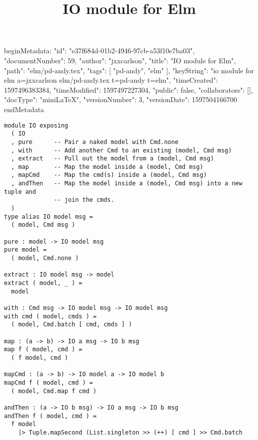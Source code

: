 beginMetadata:
{
    "id": "e37f684d-01b2-4946-97cb-a53f10e7ba03",
    "documentNumber": 59,
    "author": "jxxcarlson",
    "title": "IO module for Elm",
    "path": "elm/pd-andy.tex",
    "tags": [
        "pd-andy",
        "elm"
    ],
    "keyString": "io module for elm a=jxxcarlson elm/pd-andy.tex t=pd-andy t=elm",
    "timeCreated": 1597496383384,
    "timeModified": 1597497227304,
    "public": false,
    "collaborators": [],
    "docType": "miniLaTeX",
    "versionNumber": 3,
    "versionDate": 1597504166700
}
endMetadata\title{IO module for Elm}

\maketitle 


\begin{verbatim}
module IO exposing
  ( IO
  , pure      -- Pair a naked model with Cmd.none
  , with      -- Add another Cmd to an existing (model, Cmd msg)
  , extract   -- Pull out the model from a (model, Cmd msg)
  , map       -- Map the model inside a (model, Cmd msg)
  , mapCmd    -- Map the cmd(s) inside a (model, Cmd msg)
  , andThen   -- Map the model inside a (model, Cmd msg) into a new tuple and
              -- join the cmds.
  )
type alias IO model msg =
  ( model, Cmd msg )

pure : model -> IO model msg
pure model =
  ( model, Cmd.none )

extract : IO model msg -> model
extract ( model, _ ) =
  model

with : Cmd msg -> IO model msg -> IO model msg
with cmd ( model, cmds ) =
  ( model, Cmd.batch [ cmd, cmds ] )

map : (a -> b) -> IO a msg -> IO b msg
map f ( model, cmd ) =
  ( f model, cmd )

mapCmd : (a -> b) -> IO model a -> IO model b
mapCmd f ( model, cmd ) =
  ( model, Cmd.map f cmd )

andThen : (a -> IO b msg) -> IO a msg -> IO b msg
andThen f ( model, cmd ) =
  f model
    |> Tuple.mapSecond (List.singleton >> (++) [ cmd ] >> Cmd.batch

\end{verbatim}